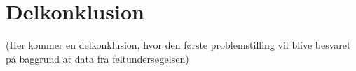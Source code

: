 \chapter{Delkonklusion}
\label{ParametreDelKonklusion}
(Her kommer en delkonklusion, hvor den første problemstilling vil blive besvaret på baggrund at data fra feltundersøgelsen)

